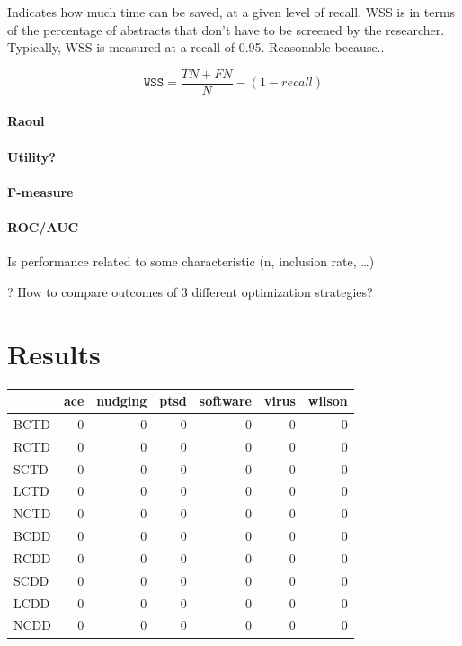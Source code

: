 \documentclass[
]{article}
\begin{document}
Indicates how much time can be saved, at a given level of recall. WSS is
in terms of the percentage of abstracts that don't have to be screened
by the researcher. Typically, WSS is measured at a recall of 0.95.
Reasonable because..

\[\texttt{WSS} = \frac{TN + FN}{N} - (1- recall) \]

\hypertarget{raoul}{%
\paragraph{Raoul}\label{raoul}}

\hypertarget{utility}{%
\paragraph{Utility?}\label{utility}}

\hypertarget{f-measure}{%
\paragraph{F-measure}\label{f-measure}}

\hypertarget{rocauc}{%
\paragraph{ROC/AUC}\label{rocauc}}

Is performance related to some characteristic (n, inclusion rate,
\ldots)

? How to compare outcomes of 3 different optimization strategies?

\newpage

\hypertarget{results-1}{%
\section{Results}\label{results-1}}

\begin{tabular}{l|r|r|r|r|r|r}
\hline
  & ace & nudging & ptsd & software & virus & wilson\\
\hline
BCTD & 0 & 0 & 0 & 0 & 0 & 0\\
\hline
RCTD & 0 & 0 & 0 & 0 & 0 & 0\\
\hline
SCTD & 0 & 0 & 0 & 0 & 0 & 0\\
\hline
LCTD & 0 & 0 & 0 & 0 & 0 & 0\\
\hline
NCTD & 0 & 0 & 0 & 0 & 0 & 0\\
\hline
BCDD & 0 & 0 & 0 & 0 & 0 & 0\\
\hline
RCDD & 0 & 0 & 0 & 0 & 0 & 0\\
\hline
SCDD & 0 & 0 & 0 & 0 & 0 & 0\\
\hline
LCDD & 0 & 0 & 0 & 0 & 0 & 0\\
\hline
NCDD & 0 & 0 & 0 & 0 & 0 & 0\\
\hline
\end{tabular}
\end{document}
